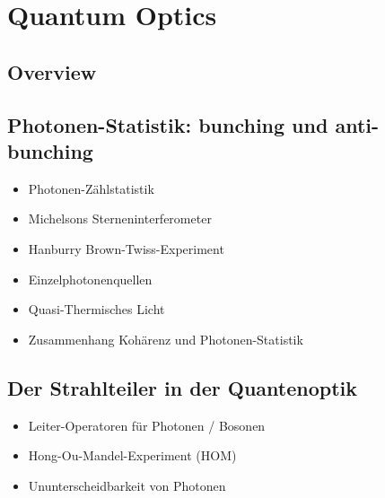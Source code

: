 \renewcommand{\lastmod}{September 18, 2023}
\renewcommand{\chapterauthors}{Markus Lippitz}

\chapter{Quantum Optics}

\section{Overview}

\section{Photonen-Statistik: bunching und anti-bunching}



\begin{itemize}
\item Photonen-Zählstatistik
\item Michelsons Sterneninterferometer
\item Hanburry Brown-Twiss-Experiment
\item Einzelphotonenquellen
\item Quasi-Thermisches Licht
\item Zusammenhang Kohärenz und Photonen-Statistik
\end{itemize}


\section{Der Strahlteiler in der Quantenoptik}



\begin{itemize}
\item Leiter-Operatoren für Photonen / Bosonen
\item Hong-Ou-Mandel-Experiment (HOM)
\item Ununterscheidbarkeit von Photonen
\end{itemize}


\printbibliography[segment=\therefsegment,heading=subbibliography]
